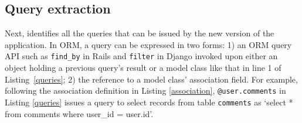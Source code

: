  
 
 

% 


\subsection{Query extraction}
Next, \Tool identifies all the queries that can be
issued by the new version of the application.
In ORM, a query can be expressed in two forms: 1) an ORM query API such as
\texttt{find\_by} in Rails and \texttt{filter} in Django invoked upon either
an object holding a previous query's result
or a model class like that in
line 1 of Listing~\ref{queries};
2) the reference to a model class' association field. For example, 
following the association definition in Listing \ref{association}, \texttt{@user.comments} in Listing \ref{queries}
issues a query to select records from table 
\texttt{comments} as `select * from comments where user\_id = user.id'. 

